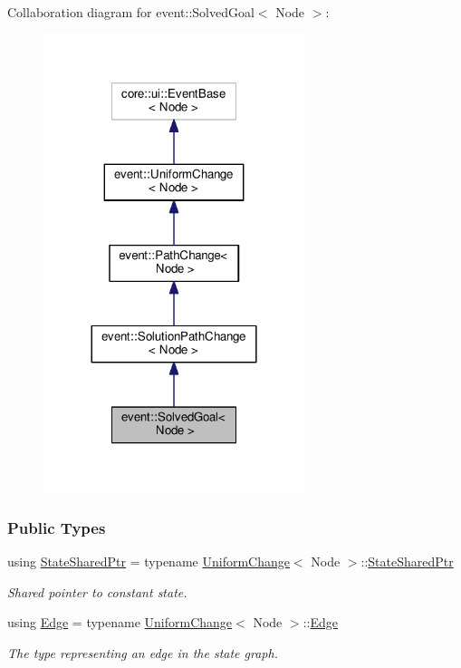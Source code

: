 Collaboration diagram for event\+:\+:Solved\+Goal$<$ Node $>$\+:\nopagebreak
\begin{figure}[H]
\begin{center}
\leavevmode
\includegraphics[width=216pt]{structevent_1_1SolvedGoal__coll__graph}
\end{center}
\end{figure}
\subsubsection*{Public Types}
\begin{DoxyCompactItemize}
\item 
using \hyperlink{structevent_1_1SolvedGoal_a297e1b13b6545c6ef6120b228d1e1fd4}{State\+Shared\+Ptr} = typename \hyperlink{structevent_1_1UniformChange}{Uniform\+Change}$<$ Node $>$\+::\hyperlink{structevent_1_1UniformChange_a8f41f1a24c711875b55419d9f0eb6bd2}{State\+Shared\+Ptr}\hypertarget{structevent_1_1SolvedGoal_a297e1b13b6545c6ef6120b228d1e1fd4}{}\label{structevent_1_1SolvedGoal_a297e1b13b6545c6ef6120b228d1e1fd4}

\begin{DoxyCompactList}\small\item\em Shared pointer to constant state. \end{DoxyCompactList}\item 
using \hyperlink{structevent_1_1SolvedGoal_ad6798cc9b06975d874f663b16375b229}{Edge} = typename \hyperlink{structevent_1_1UniformChange}{Uniform\+Change}$<$ Node $>$\+::\hyperlink{structevent_1_1UniformChange_a74eab4759202393dcf9438a25bd9261e}{Edge}\hypertarget{structevent_1_1SolvedGoal_ad6798cc9b06975d874f663b16375b229}{}\label{structevent_1_1SolvedGoal_ad6798cc9b06975d874f663b16375b229}

\begin{DoxyCompactList}\small\item\em The type representing an edge in the state graph. \end{DoxyCompactList}\end{DoxyCompactItemize}
